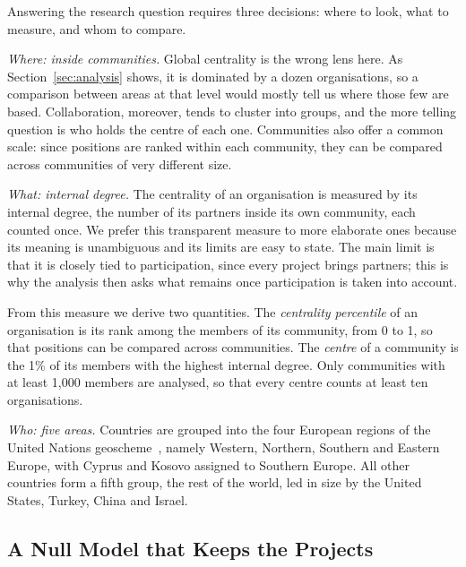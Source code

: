 \documentclass[sigchi]{acmart}
\begin{document}
Answering the research question requires three decisions: where to look, what to measure, and whom to compare.

\emph{Where: inside communities.} Global centrality is the wrong lens here. As Section~\ref{sec:analysis} shows, it is dominated by a dozen organisations, so a comparison between areas at that level would mostly tell us where those few are based. Collaboration, moreover, tends to cluster into groups, and the more telling question is who holds the centre of each one. Communities also offer a common scale: since positions are ranked within each community, they can be compared across communities of very different size.

\emph{What: internal degree.} The centrality of an organisation is measured by its internal degree, the number of its partners inside its own community, each counted once. We prefer this transparent measure to more elaborate ones because its meaning is unambiguous and its limits are easy to state. The main limit is that it is closely tied to participation, since every project brings partners; this is why the analysis then asks what remains once participation is taken into account.

From this measure we derive two quantities. The \emph{centrality percentile} of an organisation is its rank among the members of its community, from 0 to 1, so that positions can be compared across communities. The \emph{centre} of a community is the 1\% of its members with the highest internal degree. Only communities with at least 1,000 members are analysed, so that every centre counts at least ten organisations.

\emph{Who: five areas.} Countries are grouped into the four European regions of the United Nations geoscheme~\cite{m49}, namely Western, Northern, Southern and Eastern Europe, with Cyprus and Kosovo assigned to Southern Europe. All other countries form a fifth group, the rest of the world, led in size by the United States, Turkey, China and Israel.

\subsection{A Null Model that Keeps the Projects}
\end{document}
